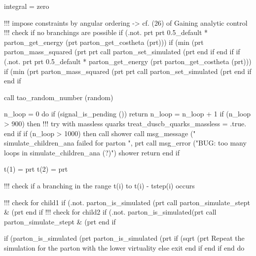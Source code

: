     integral = zero

    !!! impose constraints by angular ordering -> cf. (26) of Gaining analytic control
    !!! check if no branchings are possible
    if (.not. prt%
       prt%
            0.5_default * parton_get_energy (prt%
            parton_get_costheta (prt)))
       if (min (prt%
            parton_mass_squared (prt%
          prt%
          call parton_set_simulated (prt%
       end if
    end if
    if (.not. prt%
       prt%
            0.5_default * parton_get_energy (prt%
            parton_get_costheta (prt)))
       if (min (prt%
            parton_mass_squared (prt%
          prt%
          call parton_set_simulated (prt%
       end if
    end if

    call tao_random_number (random)

    n_loop = 0
    do
       if (signal_is_pending ()) return
       n_loop = n_loop + 1
       if (n_loop > 900) then
          !!! try with massless quarks
          treat_duscb_quarks_massless = .true.
       end if
       if (n_loop > 1000) then
          call shower%
          call msg_message (" simulate_children_ana failed for parton ", prt%
          call msg_error ("BUG: too many loops in simulate_children_ana (?)")
          shower%
          return
       end if

       t(1) = prt%
       t(2) = prt%

       !!! check if a branching in the range t(i) to t(i) - tstep(i) occurs

       !!! check for child1
       if (.not. parton_is_simulated (prt%
          call parton_simulate_stept &
               (prt%
       end if
       !!! check for child2
       if (.not. parton_is_simulated(prt%
          call parton_simulate_stept &
               (prt%
       end if

       if (parton_is_simulated (prt%
           parton_is_simulated (prt%
          if (sqrt (prt%
            \LA{}Repeat the simulation for the parton with the lower virtuality\RA{}
          else
             exit
          end if
       end if
    end do

